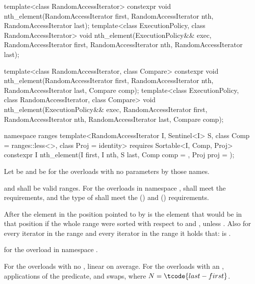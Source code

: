 %
\begin{itemdecl}
template<class RandomAccessIterator>
  constexpr void nth_element(RandomAccessIterator first, RandomAccessIterator nth,
                             RandomAccessIterator last);
template<class ExecutionPolicy, class RandomAccessIterator>
  void nth_element(ExecutionPolicy&& exec,
                   RandomAccessIterator first, RandomAccessIterator nth,
                   RandomAccessIterator last);

template<class RandomAccessIterator, class Compare>
  constexpr void nth_element(RandomAccessIterator first, RandomAccessIterator nth,
                             RandomAccessIterator last,  Compare comp);
template<class ExecutionPolicy, class RandomAccessIterator, class Compare>
  void nth_element(ExecutionPolicy&& exec,
                   RandomAccessIterator first, RandomAccessIterator nth,
                   RandomAccessIterator last, Compare comp);

namespace ranges {
  template<RandomAccessIterator I, Sentinel<I> S, class Comp = ranges::less<>,
           class Proj = identity>
    requires Sortable<I, Comp, Proj>
    constexpr I
      nth_element(I first, I nth, S last, Comp comp = {}, Proj proj = {});
}
\end{itemdecl}

\begin{itemdescr}
\pnum
Let  be 
and  be 
for the overloads with no parameters by those names.

\pnum
\requires
{} and  shall be valid ranges.
For the overloads in namespace ,
 shall meet
the  requirements, and
the type of  shall meet
the  () and
 () requirements.

\pnum
\effects
After  the element in the position pointed to by 
is the element that would be in that position
if the whole range were sorted with respect to  and ,
unless .
Also for every iterator  in the range 
and every iterator  in the range 
it holds that:
 is .

\pnum
\returns
{} for the overload in namespace .

\pnum
\complexity
For the overloads with no , linear on average.
For the overloads with an ,  applications of
the predicate, and  swaps, where $N = \tcode{last - first}$.
\end{itemdescr}

